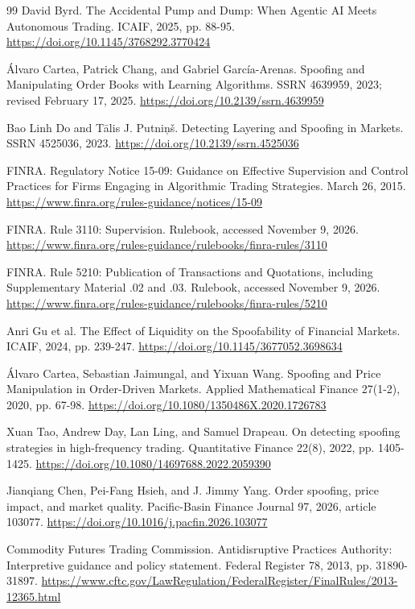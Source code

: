 \documentclass{article}
\begin{document}
\begin{thebibliography}{99}
 David Byrd. The Accidental Pump and Dump: When Agentic AI Meets Autonomous Trading. ICAIF, 2025, pp. 88-95.
\url{https://doi.org/10.1145/3768292.3770424}

 \'{A}lvaro Cartea, Patrick Chang, and Gabriel Garc\'{i}a-Arenas. Spoofing and Manipulating Order Books with Learning Algorithms. SSRN 4639959, 2023; revised February 17, 2025.
\url{https://doi.org/10.2139/ssrn.4639959}

 Bao Linh Do and T\={a}lis J. Putni\c{n}\v{s}. Detecting Layering and Spoofing in Markets. SSRN 4525036, 2023.
\url{https://doi.org/10.2139/ssrn.4525036}

 FINRA. Regulatory Notice 15-09: Guidance on Effective Supervision and Control Practices for Firms Engaging in Algorithmic Trading Strategies. March 26, 2015.
\url{https://www.finra.org/rules-guidance/notices/15-09}

 FINRA. Rule 3110: Supervision. Rulebook, accessed November 9, 2026.
\url{https://www.finra.org/rules-guidance/rulebooks/finra-rules/3110}

 FINRA. Rule 5210: Publication of Transactions and Quotations, including Supplementary Material .02 and .03. Rulebook, accessed November 9, 2026.
\url{https://www.finra.org/rules-guidance/rulebooks/finra-rules/5210}

 Anri Gu et al. The Effect of Liquidity on the Spoofability of Financial Markets. ICAIF, 2024, pp. 239-247.
\url{https://doi.org/10.1145/3677052.3698634}

 \'{A}lvaro Cartea, Sebastian Jaimungal, and Yixuan Wang. Spoofing and Price Manipulation in Order-Driven Markets. Applied Mathematical Finance 27(1-2), 2020, pp. 67-98.
\url{https://doi.org/10.1080/1350486X.2020.1726783}

 Xuan Tao, Andrew Day, Lan Ling, and Samuel Drapeau. On detecting spoofing strategies in high-frequency trading. Quantitative Finance 22(8), 2022, pp. 1405-1425.
\url{https://doi.org/10.1080/14697688.2022.2059390}

 Jianqiang Chen, Pei-Fang Hsieh, and J. Jimmy Yang. Order spoofing, price impact, and market quality. Pacific-Basin Finance Journal 97, 2026, article 103077.
\url{https://doi.org/10.1016/j.pacfin.2026.103077}

 Commodity Futures Trading Commission. Antidisruptive Practices Authority: Interpretive guidance and policy statement. Federal Register 78, 2013, pp. 31890-31897.
\url{https://www.cftc.gov/LawRegulation/FederalRegister/FinalRules/2013-12365.html}


\end{thebibliography}
\end{document}
